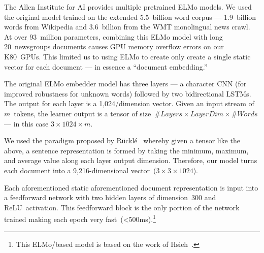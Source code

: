 The Allen Institute for AI provides multiple pretrained ELMo models.  We used the original model trained on the extended 5.5~billion word corpus --- 1.9~billion words from Wikipedia and 3.6~billion from the WMT monolingual news crawl. At over 93~million parameters, combining this ELMo model with long 20~newsgroups documents causes GPU memory overflow errors on our K80~GPUs.  This limited us to using ELMo to create only create a single static vector for each document --- in essence a ``document embedding.''

The original ELMo embedder model has three layers --- a character CNN (for improved robustness for unknown words) followed by two bidirectional LSTMs.  The output for each layer is a 1,024\-/dimension vector.  Given an input stream of $m$~tokens, the learner output is a tensor of size~${\#Layers \times LayerDim \times \#Words}$ --- in this case ${3 \times 1024 \times m}$.

We used the paradigm proposed by R\"{u}ckl\'{e}\etal~\cite{Ruckle:2018} whereby given a tensor like the above, a sentence representation is formed by taking the minimum, maximum, and average value along each layer output dimension. Therefore, our model turns each document into a 9,216-dimensional vector~(${3\times3\times1024}$).

Each aforementioned static aforementioned document representation is input into a feedforward network with two hidden layers of dimension~300 and ReLU~activation.  This feedforward block is the only portion of the network trained making each epoch very fast~(<500ms).\footnote{This ELMo\-/based model is based on the work of Hsieh\etal~\cite{Hsieh:2018}.}
